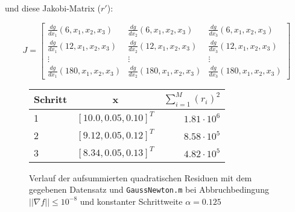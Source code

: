\documentclass[a4paper, 12pt]{report}
\begin{document}
und diese Jakobi-Matrix ($r'$):

$$ J = \begin{bmatrix}
  \frac{dg}{dx_1}(6, x_1, x_2, x_3) & \frac{dg}{dx_2}(6, x_1, x_2, x_3) & \frac{dg}{dx_3}(6, x_1, x_2, x_3)\\
  \frac{dg}{dx_1}(12, x_1, x_2, x_3) & \frac{dg}{dx_2}(12, x_1, x_2, x_3) & \frac{dg}{dx_3}(12, x_1, x_2, x_3)\\
  \vdots & \vdots & \vdots\\
  \frac{dg}{dx_1}(180, x_1, x_2, x_3) & \frac{dg}{dx_2}(180, x_1, x_2, x_3) & \frac{dg}{dx_3}(180, x_1, x_2, x_3)
\end{bmatrix}$$

\begin{figure}[H]
  \centering
  \def\arraystretch{1.25}
  \begin{tabular}{l|c|r}
    \hline
    \textbf{Schritt} & \textbf{x} & \textbf{$\sum_{i=1}^M (r_i)^2$}\\
    \hline
    1 & $[10.0, 0.05, 0.10]^T$ & $1.81\cdot 10^{6}$\\
    2 & $[9.12, 0.05, 0.12]^T$ & $8.58\cdot 10^{5}$\\
    3 & $[8.34, 0.05, 0.13]^T$ & $4.82\cdot 10^{5}$\\
    \hline
  \end{tabular}
  \caption{Verlauf der aufsummierten quadratischen Residuen mit dem gegebenen Datensatz und
        \lstinline[basicstyle=\ttfamily\color{black}]|GaussNewton.m| bei Abbruchbedingung $||\nabla f|| \leq 10^{-8}$
        und konstanter Schrittweite $\alpha = 0.125$ }
\end{figure}
\end{document}
